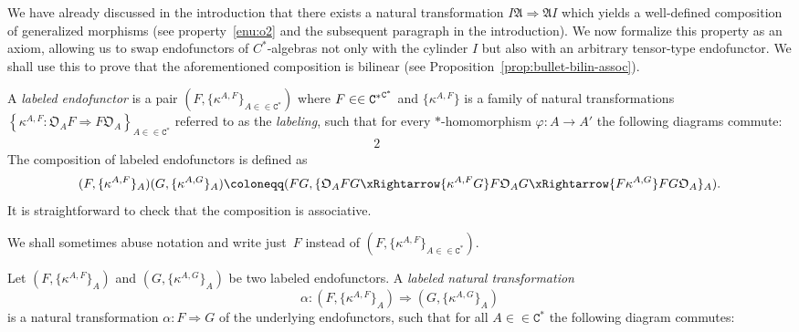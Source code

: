 \documentclass[10pt]{simplearticle}
\newcommand{\tikzinput}[1]{}
\newcommand{\Cstar}{\mathtt{C^{*}}}
\begin{document}
We
have already discussed in the introduction
that there exists a natural transformation $I\mathfrak{A}\Rightarrow\mathfrak{A}I$
which yields a well-defined composition of generalized morphisms (see
property~\ref{enu:o2} and the subsequent paragraph in the introduction).
We now formalize this property as an axiom, allowing us to swap endofunctors
of $C^{*}$-algebras not only with the cylinder $I$ but also with
an arbitrary tensor-type endofunctor. We shall use this to prove that
 the aforementioned composition is bilinear (see Proposition~\ref{prop:bullet-bilin-assoc}).
\begin{defn}\label{def:labeled-endof}
A \emph{labeled endofunctor} is a pair $(F,\{\kappa^{A,F}\}_{A\in\in\Cstar})$
where $F\in\in\text{\ensuremath{\Cstar}}^{\text{\ensuremath{\Cstar}}}$
and $\{\kappa^{A,F}\}$ is a family of natural transformations $\left\{ \kappa^{A,F}\colon\mathfrak{O}_{A}F\Rightarrow F\mathfrak{O}_{A}\right\} _{A\in\in\Cstar}$
referred to as the \emph{labeling}, such that for every $*$-homomorphism
$\varphi\colon A\to A'$ the following diagrams commute:
\begin{equation}
\tikzinput{d245}\label{eq:kappa-def-2}
\end{equation}
\begin{alignat}{2}
\tikzinput{d246} & \qquad & \tikzinput{d247}\label{eq:kappa-def22}
\end{alignat}
The composition of labeled endofunctors is defined as
\[
(F,\{\kappa^{A,F}\}_{A})(G,\{\kappa^{A,G}\}_{A})\coloneqq(FG,\{\mathfrak{O}_{A}FG\xRightarrow{\kappa^{A,F}G}F\mathfrak{O}_{A}G\xRightarrow{F\kappa^{A,G}}FG\mathfrak{O}_{A}\}_{A}).
\]
It is straightforward to check that the composition is associative.

We shall sometimes abuse notation and write just~$F$ instead of
$(F,\{\kappa^{A,F}\}_{A\in\in\Cstar})$.
\end{defn}

\begin{defn}\label{def:admissible}
Let
$(F,\{\kappa^{A,F}\}_{A})$
and $(G,\{\kappa^{A,G}\}_{A})$ be two labeled endofunctors. A \emph{labeled
natural transformation}
\[
\alpha\colon(F,\{\kappa^{A,F}\}_{A})\Rightarrow(G,\{\kappa^{A,G}\}_{A})
\]
is a natural transformation $\alpha\colon F\Rightarrow G$ of the
underlying endofunctors, such that for all $A\in\in\Cstar$ the following
diagram commutes:
\[
\tikzinput{d248}
\]
\end{defn}
\end{document}

